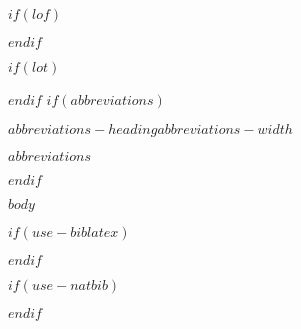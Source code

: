 \documentclass[a4paper, $if(page-layout)$$page-layout$$endif$]{templates/ociamthesis}
\begin{document}
\begin{romanpages}
\flushbottom

{}
\tableofcontents

$if(lof)$
\listoffigures
	\mtcaddchapter
$endif$

$if(lot)$
\listoftables
  \mtcaddchapter
$endif$
$if(abbreviations)$
\begin{mclistof}{$abbreviations-heading$}{$abbreviations-width$}

$abbreviations$

\end{mclistof} 

$endif$

\end{romanpages}

\flushbottom

$body$

$if(use-biblatex)$
\setlength{\baselineskip}{0pt} %

{\renewcommand*\MakeUppercase[1]{#1}%
\printbibliography[heading=none]}

$endif$

$if(use-natbib)$

$endif$
\end{document}
